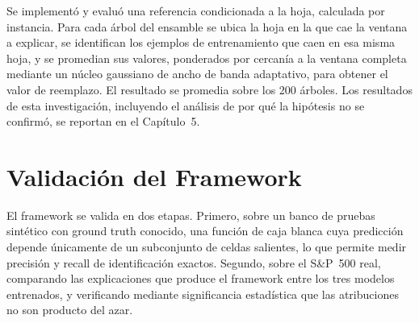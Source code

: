 Se implementó y evaluó una referencia condicionada a la hoja, calculada por instancia. Para cada árbol del ensamble se ubica la hoja en la que cae la ventana a explicar, se identifican los ejemplos de entrenamiento que caen en esa misma hoja, y se promedian sus valores, ponderados por cercanía a la ventana completa mediante un núcleo gaussiano de ancho de banda adaptativo, para obtener el valor de reemplazo. El resultado se promedia sobre los 200 árboles. Los resultados de esta investigación, incluyendo el análisis de por qué la hipótesis no se confirmó, se reportan en el Capítulo~5.

\section{Validación del Framework}

El framework se valida en dos etapas. Primero, sobre un banco de pruebas sintético con ground truth conocido, una función de caja blanca cuya predicción depende únicamente de un subconjunto de celdas salientes, lo que permite medir precisión y recall de identificación exactos. Segundo, sobre el S\&P~500 real, comparando las explicaciones que produce el framework entre los tres modelos entrenados, y verificando mediante significancia estadística que las atribuciones no son producto del azar.
